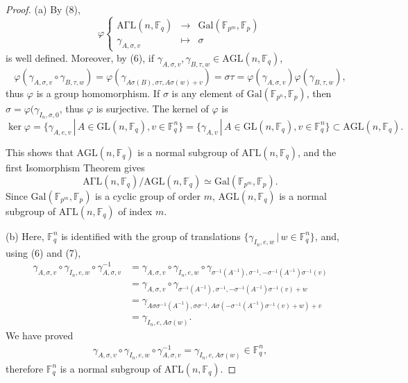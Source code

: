 \documentclass[11pt,a4paper]{article}
\newcommand{\F}{\mathbb{F}}
\newcommand{\Gal}{\mathrm{Gal}}
\begin{document}
 \begin{proof}
 \item[(a)] 
 By (8),
 $$
 \varphi
 \left\{
 \begin{array}{ccc}
 \mathrm{A\Gamma L}(n,\F_q) &\to & \Gal(\F_{p^m},\F_p)\\
 \gamma_{A,\sigma,v} & \mapsto & \sigma
 \end{array}
 \right.
 $$
 is well defined. Moreover, by (6), if $\gamma_{A,\sigma,v}, \gamma_{B,\tau,w} \in \mathrm{AGL}(n,\F_q)$,
 $$\varphi(\gamma_{A,\sigma,v} \circ \gamma_{B,\tau,w} ) = \varphi( \gamma_{A\sigma(B),\sigma \tau,A \sigma(w) + v}) =\sigma \tau = \varphi(\gamma_{A,\sigma,v})\varphi( \gamma_{B,\tau,w}),
 $$
 thus $\varphi$ is a group homomorphism. If $\sigma$ is any element of $\Gal(\F_{p^n},\F_p)$, then $\sigma = \varphi(\gamma_{I_n, \sigma,0}$, thus $\varphi$ is surjective. The kernel of $\varphi$ is
 $$\ker \varphi = \{\gamma_{A,e,v}\, | \, A\in \mathrm{GL}(n,\F_q), v \in \F_q^n\} = \{\gamma_{A,v}\, | \, A\in \mathrm{GL}(n,\F_q), v \in \F_q^n\}  \subset \mathrm{AGL}(n,\F_q).$$

This shows that $\mathrm{AGL}(n,\F_q)$ is a normal subgroup of $\mathrm{A\Gamma L}(n,\F_q)$, and the first Isomorphism Theorem gives
$$ \mathrm{A\Gamma L}(n,\F_q)/ \mathrm{AGL}(n,\F_q) \simeq \Gal(\F_{p^m},\F_p).$$
Since $\Gal(\F_{p^m},\F_p)$ is a cyclic group of order $m$, $\mathrm{AGL}(n,\F_q)$ is a normal subgroup of $\mathrm{A\Gamma L}(n,\F_q)$ of index $m$.

\item[(b)] Here, $\F_q^n$ is identified with the group of translations $\{\gamma_{I_n,e,w}\,|\, w \in \F_q^n\}$, and, using (6) and (7),
\begin{align*}
\gamma_{A,\sigma,v} \circ \gamma_{I_n,e,w} \circ \gamma_{A,\sigma,v}^{-1} &= \gamma_{A,\sigma,v} \circ \gamma_{I_n,e,w}  \circ \gamma_{\sigma^{-1}(A^{-1}),\sigma^{-1},- \sigma^{-1}(A^{-1})\sigma^{-1}(v)}\\
&= \gamma_{A,\sigma,v} \circ  \gamma_{\sigma^{-1}(A^{-1}),\sigma^{-1},-\sigma^{-1}(A^{-1}) \sigma^{-1}(v) + w}\\
&=\gamma_{A \sigma \sigma^{-1}(A^{-1}),\sigma \sigma^{-1}, A\sigma(-\sigma^{-1}(A^{-1}) \sigma^{-1}(v) + w) + v}\\
&= \gamma_{I_n,e,A\sigma(w)}.
\end{align*}
We have proved
\begin{align}
\gamma_{A,\sigma,v} \circ \gamma_{I_n,e,w} \circ \gamma_{A,\sigma,v}^{-1} = \gamma_{I_n,e,A\sigma(w)} \in \F_q^n,
\end{align}
therefore $\F_q^n$ is a normal subgroup of $\mathrm{A\Gamma L}(n,\F_q)$.


\end{proof}
\end{document}
